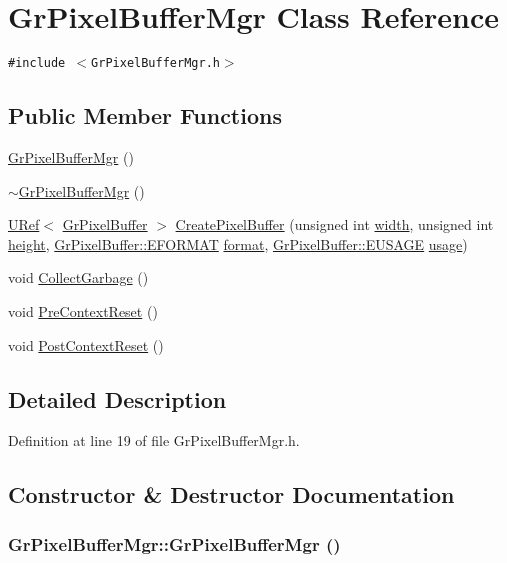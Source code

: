 \hypertarget{class_gr_pixel_buffer_mgr}{
\section{GrPixelBufferMgr Class Reference}
\label{class_gr_pixel_buffer_mgr}
}
{\tt \#include $<$GrPixelBufferMgr.h$>$}

\subsection*{Public Member Functions}
\begin{CompactItemize}
\item 
\hyperlink{class_gr_pixel_buffer_mgr_e9a1fc2a74a5262fc596c47a4e48b869}{GrPixelBufferMgr} ()
\item 
\hyperlink{class_gr_pixel_buffer_mgr_89b7d9903422d9913f02cd5fd98c4fca}{$\sim$GrPixelBufferMgr} ()
\item 
\hyperlink{class_u_ref}{URef}$<$ \hyperlink{class_gr_pixel_buffer}{GrPixelBuffer} $>$ \hyperlink{class_gr_pixel_buffer_mgr_7d2027e6a200df97e492a2e8de57f309}{CreatePixelBuffer} (unsigned int \hyperlink{wglext_8h_e6531b1788ca42a9ae8155b0c52e7630}{width}, unsigned int \hyperlink{wglext_8h_b2e63df950c3789599e1e43f477bc9e3}{height}, \hyperlink{class_gr_pixel_buffer_f9df985b34eb04e3465c776a8e9d7cbe}{GrPixelBuffer::EFORMAT} \hyperlink{glext__bak_8h_e2d3db041c6004a67047659b42f73a44}{format}, \hyperlink{class_gr_pixel_buffer_161569e2857876088c519a6e52fd6785}{GrPixelBuffer::EUSAGE} \hyperlink{glext__bak_8h_ae276f20e85f16470de5a0a71eb25bc2}{usage})
\item 
void \hyperlink{class_gr_pixel_buffer_mgr_7175ec10dbcfa1340ee9b991384030fc}{CollectGarbage} ()
\item 
void \hyperlink{class_gr_pixel_buffer_mgr_0385b0a4ac49d123f10aeb25285f0a63}{PreContextReset} ()
\item 
void \hyperlink{class_gr_pixel_buffer_mgr_f038b8a6efbdf78068071794d2ed565d}{PostContextReset} ()
\end{CompactItemize}


\subsection{Detailed Description}


Definition at line 19 of file GrPixelBufferMgr.h.

\subsection{Constructor \& Destructor Documentation}
\hypertarget{class_gr_pixel_buffer_mgr_e9a1fc2a74a5262fc596c47a4e48b869}{
\subsubsection[{GrPixelBufferMgr}]{\setlength{\rightskip}{0pt plus 5cm}GrPixelBufferMgr::GrPixelBufferMgr ()}}
\label{class_gr_pixel_buffer_mgr_e9a1fc2a74a5262fc596c47a4e48b869}





